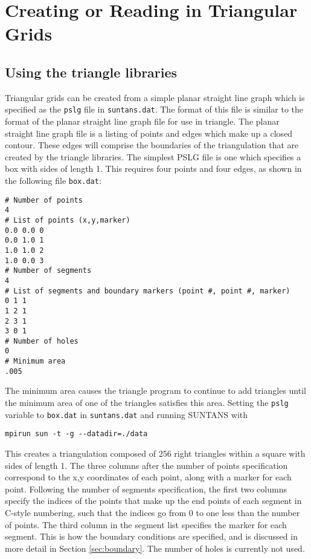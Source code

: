 \documentclass[12pt,oneside]{article}
\begin{document}
\section{Creating or Reading in Triangular Grids} \label{sec:grids}

\subsection{Using the triangle libraries} \label{sec:tri}

Triangular grids can be created from a simple planar straight line
graph which is specified as the \verb+pslg+ file in \verb+suntans.dat+.
The format of this file is similar to the format of the planar straight
line graph file for use in triangle.  The planar straight line graph
file is a listing of points and edges which make up a closed contour.
These edges will comprise the boundaries of the triangulation that are
created by the triangle libraries.  The simplest PSLG file is one which
specifies a box with sides of length 1.  This requires four points and
four edges, as shown in the following file \verb+box.dat+:
\begin{verbatim}
# Number of points
4
# List of points (x,y,marker)
0.0 0.0 0
0.0 1.0 1
1.0 1.0 2
1.0 0.0 3
# Number of segments
4
# List of segments and boundary markers (point #, point #, marker)
0 1 1
1 2 1
2 3 1
3 0 1
# Number of holes
0
# Minimum area
.005
\end{verbatim}
The minimum area causes the triangle program to continue to add triangles
until the minimum area of one of the triangles satisfies this area.  
Setting the \verb+pslg+ variable to \verb+box.dat+ in \verb+suntans.dat+
and running SUNTANS with
\begin{verbatim}
mpirun sun -t -g --datadir=./data
\end{verbatim}
This creates a triangulation composed of 256 right triangles within a square
with sides of length 1.  The three columns after the number of points
specification correspond to the x,y coordinates of each point, along
with a marker for each point.  Following the number of segments specification,
the first two columns specify the indices of the points that make up
the end points of each segment in C-style numbering, such that the indices
go from 0 to one less than the number of points.  The third column in the
segment list specifies the marker for each segment.  This is how the boundary
conditions are specified, and is discussed in more detail in Section \ref{sec:boundary}.
The number of holes is currently not used.
\end{document}
